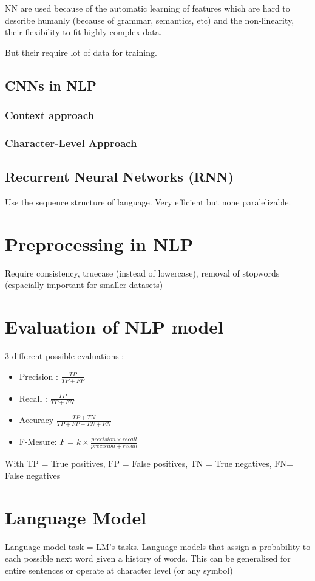 			NN are used because of the automatic learning of features which are hard to describe humanly (because of grammar, semantics, etc) and the non-linearity, their flexibility to fit highly complex data. 

			But their require lot of data for training. 


		\subsection{CNNs in NLP}

			\subsubsection{Context approach}

			\subsubsection*{Character-Level Approach}

		\subsection{Recurrent Neural Networks (RNN)}
			Use the sequence structure of language. Very efficient but none paralelizable. 
		\section{Preprocessing in NLP}
			Require consistency, truecase (instead of lowercase), removal of stopwords (espacially important for smaller datasets)
		\section{Evaluation of NLP model}
			3 different possible evaluations :
			\begin{itemize}
				\item Precision : $\frac{TP}{TP+FP}$
				\item Recall : $\frac{TP}{TP+FN}$
				\item Accuracy $\frac{TP+TN}{TP+FP+TN+FN}$
				\item F-Mesure: $F = k \times \frac{precision \times recall}{precision + recall}$
			\end{itemize}
			With TP = True positives, FP = False positives, TN = True negatives, FN= False negatives

		\section{Language Model}
			Language model task = LM's tasks.
			Language models that assign a probability to each possible next word given a history of words. This can be generalised for entire sentences or operate at character level (or any symbol)

